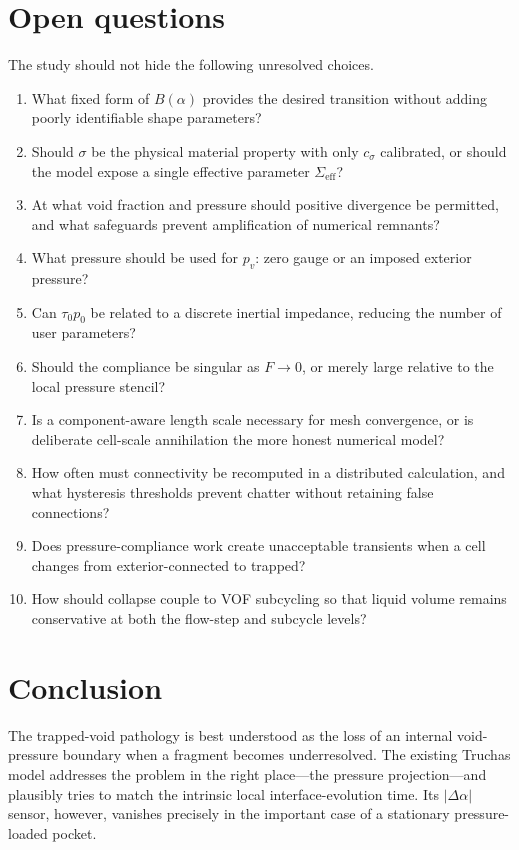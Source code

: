 \documentclass[11pt]{article}
\begin{document}
\section{Open questions}

The study should not hide the following unresolved choices.
\begin{enumerate}
  \item What fixed form of \(B(\alpha)\) provides the desired transition without adding
        poorly identifiable shape parameters?
  \item Should \(\sigma\) be the physical material property with only \(c_\sigma\)
        calibrated, or should the model expose a single effective parameter
        \(\Sigma_{\mathrm{eff}}\)?
  \item At what void fraction and pressure should positive divergence be permitted, and
        what safeguards prevent amplification of numerical remnants?
  \item What pressure should be used for \(p_v\): zero gauge or an imposed exterior
        pressure?
  \item Can \(\tau_0p_0\) be related to a discrete inertial impedance, reducing the number
        of user parameters?
  \item Should the compliance be singular as \(F\to0\), or merely large relative to the
        local pressure stencil?
  \item Is a component-aware length scale necessary for mesh convergence, or is deliberate
        cell-scale annihilation the more honest numerical model?
  \item How often must connectivity be recomputed in a distributed calculation, and what
        hysteresis thresholds prevent chatter without retaining false connections?
  \item Does pressure-compliance work create unacceptable transients when a cell changes
        from exterior-connected to trapped?
  \item How should collapse couple to VOF subcycling so that liquid volume remains
        conservative at both the flow-step and subcycle levels?
\end{enumerate}

\section{Conclusion}

The trapped-void pathology is best understood as the loss of an internal void-pressure
boundary when a fragment becomes underresolved.  The existing Truchas model addresses
the problem in the right place---the pressure projection---and plausibly tries to match
the intrinsic local interface-evolution time.  Its \(|\Delta\alpha|\) sensor, however,
vanishes precisely in the important case of a stationary pressure-loaded pocket.
\end{document}

